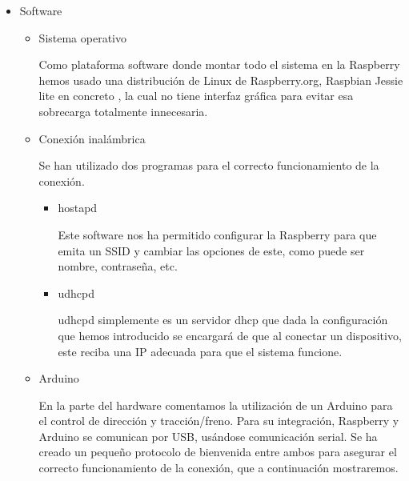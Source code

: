 \documentclass{pclass}
\begin{document}
\begin{itemize}
\item Software


\begin{itemize}
	
	\item Sistema operativo
	
	Como plataforma software donde montar todo el sistema en la Raspberry hemos usado una distribución de Linux de Raspberry.org, Raspbian Jessie lite en concreto , la cual no tiene interfaz gráfica para evitar esa sobrecarga totalmente innecesaria.
	\medskip
	
	\item Conexión inalámbrica
	
	Se han utilizado dos programas para el correcto funcionamiento de la conexión.
	
		\begin{itemize}
			\item hostapd
			\smallskip
			
			Este software nos ha permitido configurar la Raspberry para que emita un SSID y cambiar las opciones de este, como puede ser nombre, contraseña, etc.
			\smallskip
			
			\item udhcpd
			\smallskip
			
			udhcpd simplemente es un servidor dhcp que dada la configuración que hemos introducido se encargará de que al conectar un dispositivo, este reciba una IP adecuada para que el sistema funcione.
			
		\end{itemize}
	\medskip
	\item Arduino
	
	En la parte del hardware comentamos la utilización de un Arduino para el control de dirección y tracción/freno. Para su integración, Raspberry y Arduino se comunican por USB, usándose comunicación serial. Se ha creado un pequeño protocolo de bienvenida entre ambos para asegurar el correcto funcionamiento de la conexión, que a continuación mostraremos.
	

\end{itemize}
\end{itemize}
\end{document}

